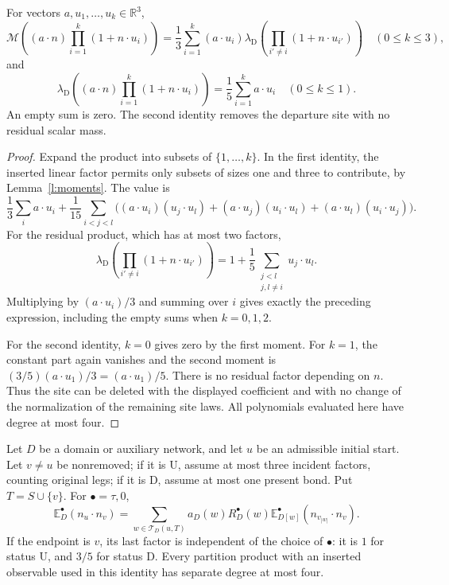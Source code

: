 \begin{lemma}\label{l:stepid}
For vectors \(a,u_1,\ldots,u_k\in\mathbb R^3\),
\[
 \mathcal M\!\left((a\cdot n)\prod_{i=1}^k(1+n\cdot u_i)\right)
 =\frac13\sum_{i=1}^k(a\cdot u_i)
       \lambda_{\mathrm D}\!\left(\prod_{i'\ne i}(1+n\cdot u_{i'})\right)
       \quad(0\le k\le3),
\]
and
\[
 \lambda_{\mathrm D}\!\left((a\cdot n)\prod_{i=1}^k(1+n\cdot u_i)\right)
       =\frac15\sum_{i=1}^k a\cdot u_i\quad(0\le k\le1).
\]
An empty sum is zero. The second identity removes the departure site
with no residual scalar mass.
\end{lemma}

\begin{proof}
Expand the product into subsets of \(\{1,\ldots,k\}\).
In the first identity, the inserted linear factor permits only
subsets of sizes one and three to contribute, by
Lemma~\ref{l:moments}. The value is
\[
 \frac13\sum_i a\cdot u_i+
 \frac1{15}\sum_{i<j<l}
 \bigl((a\cdot u_i)(u_j\cdot u_l)
       +(a\cdot u_j)(u_i\cdot u_l)
       +(a\cdot u_l)(u_i\cdot u_j)\bigr).
\]
For the residual product, which has at most two factors,
\[
 \lambda_{\mathrm D}\left(\prod_{i'\ne i}(1+n\cdot u_{i'})\right)
 =1+\frac15\sum_{\substack{j<l\\j,l\ne i}}u_j\cdot u_l.
\]
Multiplying by \((a\cdot u_i)/3\) and summing over \(i\)
gives exactly the preceding expression, including the empty sums
when \(k=0,1,2\).

For the second identity, \(k=0\) gives zero by the first moment.
For \(k=1\), the constant part again vanishes and the second
moment is
\((3/5)(a\cdot u_1)/3=(a\cdot u_1)/5\).
There is no residual factor depending on \(n\).
Thus the site can be deleted with the displayed coefficient and
with no change of the normalization of the remaining site laws.
All polynomials evaluated here have degree at most four.
\end{proof}

\begin{proposition}\label{p:pairwalk}
Let \(D\) be a domain or auxiliary network, and let \(u\) be an
admissible initial start. Let \(v\ne u\) be nonremoved; if it is
\(\mathrm U\), assume at most three incident factors, counting
original legs; if it is \(\mathrm D\), assume at most one present bond.
Put \(T=S\cup\{v\}\). For \(\bullet=\tau,0\),
\[
 \mathbb E_D^\bullet(n_u\cdot n_v)=
 \sum_{w\in\mathcal T_D(u,T)}a_D(w)R_D^\bullet(w)
           \mathbb E_{D[w]}^\bullet(n_{v_{|w|}}\cdot n_v).
\]
If the endpoint is \(v\), its last factor is independent of the
choice of \(\bullet\): it is \(1\) for status \(\mathrm U\),
and \(3/5\) for status \(\mathrm D\).
Every partition product with an inserted observable used in this
identity has separate degree at most four.
\end{proposition}

